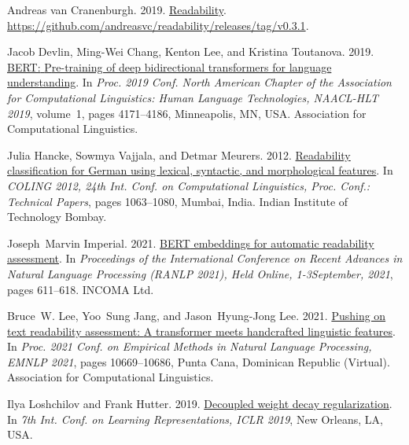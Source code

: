 \documentclass[11pt,a4paper]{article}
\begin{document}
\begin{thebibliography}{25}
  Andreas van Cranenburgh. 2019.
  \newblock \href {https://github.com/andreasvc/readability} {Readability}.
  \newblock \url{https://github.com/andreasvc/readability/releases/tag/v0.3.1}.

  Jacob Devlin, Ming{-}Wei Chang, Kenton Lee, and Kristina Toutanova. 2019.
  \newblock \href {https://doi.org/10.18653/v1/n19-1423} {{BERT:} {P}re-training
    of deep bidirectional transformers for language understanding}.
  \newblock In \emph{Proc. 2019 Conf. North American Chapter of the Association
    for Computational Linguistics: Human Language Technologies, {NAACL-HLT}
    2019}, volume~1, pages 4171--4186, Minneapolis, MN, USA. Association for
  Computational Linguistics.

  Julia Hancke, Sowmya Vajjala, and Detmar Meurers. 2012.
  \newblock \href {https://aclanthology.org/C12-1065/} {Readability
    classification for {G}erman using lexical, syntactic, and morphological
    features}.
  \newblock In \emph{{COLING} 2012, 24th Int. Conf. on Computational Linguistics,
    Proc. Conf.: Technical Papers}, pages 1063--1080, Mumbai, India. Indian
  Institute of Technology Bombay.

  Joseph~Marvin Imperial. 2021.
  \newblock \href {https://aclanthology.org/2021.ranlp-1.69} {{BERT} embeddings
    for automatic readability assessment}.
  \newblock In \emph{Proceedings of the International Conference on Recent
    Advances in Natural Language Processing {(RANLP} 2021), Held Online,
    1-3September, 2021}, pages 611--618. {INCOMA} Ltd.

  Bruce~W. Lee, Yoo~Sung Jang, and Jason~Hyung{-}Jong Lee. 2021.
  \newblock \href {https://doi.org/10.18653/v1/2021.emnlp-main.834} {Pushing on
  text readability assessment: {A} transformer meets handcrafted linguistic
  features}.
  \newblock In \emph{Proc. 2021 Conf. on Empirical Methods in Natural Language
    Processing, {EMNLP} 2021}, pages 10669--10686, Punta Cana, Dominican Republic
  (Virtual). Association for Computational Linguistics.

  Ilya Loshchilov and Frank Hutter. 2019.
  \newblock \href {https://openreview.net/forum?id=Bkg6RiCqY7} {Decoupled weight
    decay regularization}.
  \newblock In \emph{7th Int. Conf. on Learning Representations, {ICLR} 2019},
  New Orleans, LA, USA.


\end{thebibliography}
\end{document}
